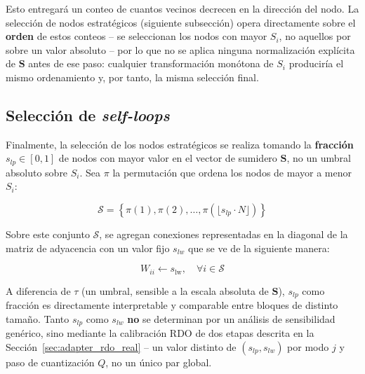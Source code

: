         Esto entregará un conteo de cuantos vecinos decrecen en la dirección del nodo. La selección de nodos estratégicos (siguiente subsección) opera directamente sobre el \textbf{orden} de estos conteos -- se seleccionan los nodos con mayor $S_i$, no aquellos por sobre un valor absoluto -- por lo que no se aplica ninguna normalización explícita de $\mathbf{S}$ antes de ese paso: cualquier transformación monótona de $S_i$ produciría el mismo ordenamiento y, por tanto, la misma selección final.

    \subsection{Selección de \textit{self-loops}}

        Finalmente, la selección de los nodos estratégicos se realiza tomando la
        \textbf{fracción} $s_{lp} \in [0,1]$ de nodos con mayor valor en el vector de sumidero
        $\mathbf{S}$, no un umbral absoluto sobre $S_i$. Sea $\pi$ la permutación que ordena los
        nodos de mayor a menor $S_i$:

        \begin{equation}
            \mathcal{S} = \left\{ \pi(1), \pi(2), \dots, \pi(\lfloor s_{lp} \cdot N \rfloor) \right\}
        \end{equation}

        Sobre este conjunto $\mathcal{S}$, se agregan conexiones representadas en la diagonal de la matriz de adyacencia con un valor fijo $s_{lw}$ que se ve de la siguiente manera:

        \begin{equation}
            W_{ii} \leftarrow s_{\text{lw}}, \quad \forall i \in \mathcal{S}
        \end{equation}

        A diferencia de $\tau$ (un umbral, sensible a la escala absoluta de $\mathbf{S}$),
        $s_{lp}$ como fracción es directamente interpretable y comparable entre bloques de
        distinto tamaño. Tanto $s_{lp}$ como $s_{lw}$ \textbf{no} se determinan por un análisis
        de sensibilidad genérico, sino mediante la calibración RDO de dos etapas descrita en la
        Sección~\ref{sec:adapter_rdo_real} -- un valor distinto de $(s_{lp}, s_{lw})$ por modo
        $j$ y paso de cuantización $Q$, no un único par global.


